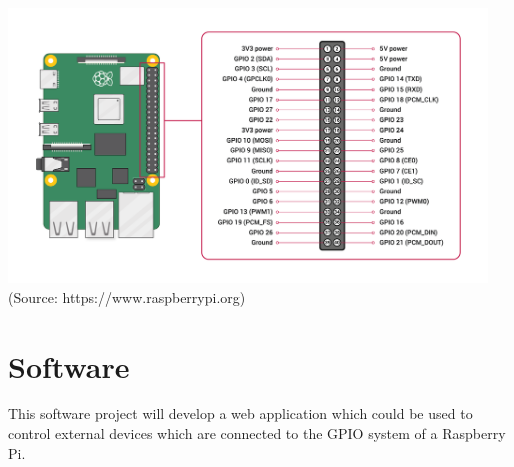\begin{centering}
\includegraphics[width=360pt]{images/coursework/gpio.png}\\
(Source: https://www.raspberrypi.org)
\end{centering}

\section{Software}
This software project will develop a web application which could
be used to control external devices which are connected to the
GPIO system of a Raspberry Pi.
